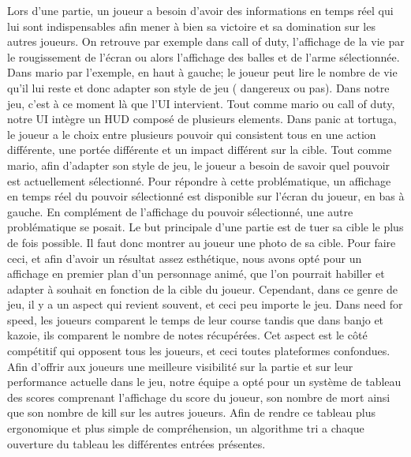         Lors d’une partie, un joueur a besoin d’avoir des informations en temps réel qui lui sont indispensables afin 
         mener à bien sa victoire et sa domination sur les autres joueurs. On retrouve par exemple dans call of duty, 
         l’affichage de la vie par le rougissement de l’écran ou alors l’affichage des balles et de l’arme sélectionnée. 
         Dans mario par l’exemple, en haut à gauche; le joueur peut lire le nombre de vie qu’il lui reste et donc adapter 
         son style de jeu ( dangereux ou pas). Dans notre jeu, c’est à ce moment là que l’UI intervient. Tout comme mario 
         ou call of duty, notre UI intègre un HUD composé de plusieurs elements. Dans panic at tortuga, le joueur a le 
         choix entre plusieurs pouvoir qui consistent tous en une action différente, une portée différente et un impact 
         différent sur la cible. Tout comme mario, afin d’adapter son style de jeu, le joueur a besoin de savoir quel 
         pouvoir est actuellement sélectionné. Pour répondre à cette problématique, un affichage en temps réel du pouvoir 
         sélectionné est disponible sur l’écran du joueur, en bas à gauche. En complément de l’affichage du pouvoir 
         sélectionné, une autre problématique se posait. Le but principale d’une partie est de tuer sa cible le plus de fois 
         possible. Il faut donc montrer au joueur une photo de sa cible. Pour faire ceci, et afin d’avoir un résultat assez 
         esthétique, nous avons opté pour un affichage en premier plan d’un personnage animé, que l’on pourrait habiller et 
         adapter à souhait en fonction de la cible du joueur. Cependant, dans ce genre de jeu, il y a un aspect qui revient 
         souvent, et ceci peu importe le jeu. Dans need for speed, les joueurs comparent le temps de leur course tandis que 
         dans banjo et kazoie, ils comparent le nombre de notes récupérées. Cet aspect est le côté compétitif qui opposent 
         tous les joueurs, et ceci toutes plateformes confondues. Afin d’offrir aux joueurs une meilleure visibilité sur la 
         partie et sur leur performance actuelle dans le jeu, notre équipe a opté pour un système de tableau des scores 
         comprenant l’affichage du score du joueur, son nombre de mort ainsi que son nombre de kill sur les autres joueurs. 
         Afin de rendre ce tableau plus ergonomique et plus simple de compréhension, un algorithme tri a chaque ouverture 
         du tableau les différentes entrées présentes. 